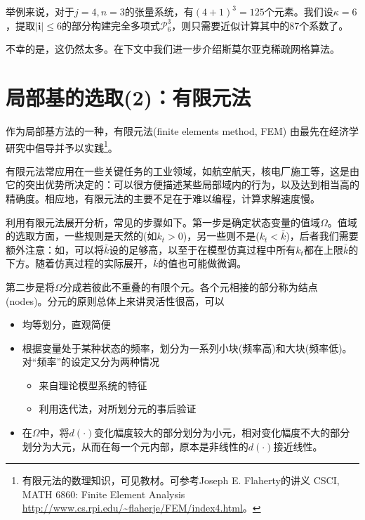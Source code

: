 举例来说，对于$j=4,n=3$的张量系统，有$(4+1)^3=125$个元素。我们设$\kappa = 6$，提取$\left| \bm{i} \right| \le 6$的部分构建完全多项式$\mathcal{P}_6^3$，则只需要近似计算其中的87个系数了。

不幸的是，这仍然太多。在下文中我们进一步介绍斯莫尔亚克稀疏网格算法。

\section{局部基的选取(2)：有限元法}
\label{sec:pj-fem}

作为局部基方法的一种，有限元法(finite elements method, FEM) 由\cite{McGrattan:1996gu}最先在经济学研究中倡导并予以实践\footnote{有限元法的数理知识，可见教材\cite{Hughes:2000ve, Brenner:2008hf}。可参考Joseph E. Flaherty的讲义 CSCI, MATH 6860: Finite Element Analysis \url{http://www.cs.rpi.edu/~flaherje/FEM/index4.html}。}。

有限元法常应用在一些关键任务的工业领域，如航空航天，核电厂施工等，这是由它的突出优势所决定的：可以很方便描述某些局部域内的行为，以及达到相当高的精确度。相应地，有限元法的主要不足在于难以编程，计算求解速度慢。

利用有限元法展开分析，常见的步骤如下。第一步是确定状态变量的值域$\Omega$。值域的选取方面，一些规则是天然的(如$k_t > 0$)，另一些则不是($k_t < \bar{k}$)，后者我们需要额外注意：如，可以将$\bar{k}$设的足够高，以至于在模型仿真过程中所有$k_t$都在上限$\bar{k}$的下方。随着仿真过程的实际展开，$\bar{k}$的值也可能做微调。

第二步是将$\Omega$分成若彼此不重叠的有限个元。各个元相接的部分称为结点(nodes)。分元的原则总体上来讲灵活性很高，可以
\begin{itemize}
  \item 均等划分，直观简便
  \item 根据变量处于某种状态的频率，划分为一系列小块(频率高)和大块(频率低)。对``频率''的设定又分为两种情况
  \begin{itemize}
    \item 来自理论模型系统的特征
    \item 利用迭代法，对所划分元的事后验证
  \end{itemize}
  \item 在$\Omega$中，将$d(\cdot)$变化幅度较大的部分划分为小元，相对变化幅度不大的部分划分为大元，从而在每一个元内部，原本是非线性的$d(\cdot)$接近线性。
\end{itemize}

